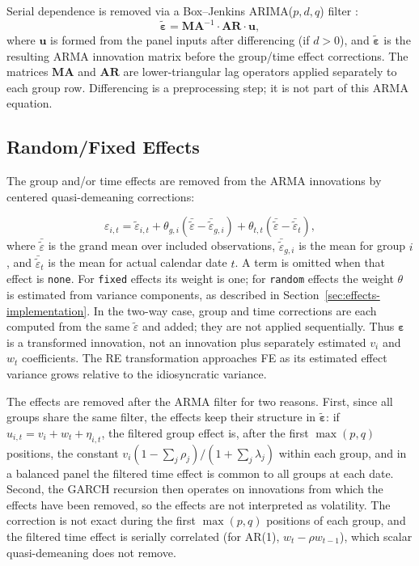 \documentclass[12pt]{article}
\begin{document}
Serial dependence is removed via a Box--Jenkins ARIMA($p,d,q$) filter \citep{box1970time}:
\begin{equation}
\tilde{\boldsymbol{\varepsilon}}
= \mathbf{MA}^{-1} \cdot \mathbf{AR} \cdot \mathbf{u},
\label{eq:arima_reduced}
\end{equation}
where $\mathbf{u}$ is formed from the panel inputs after differencing (if $d>0$), and $\tilde{\boldsymbol{\varepsilon}}$ is the resulting ARMA innovation matrix before the group/time effect corrections. The matrices $\mathbf{MA}$ and $\mathbf{AR}$ are lower-triangular lag operators applied separately to each group row. Differencing is a preprocessing step; it is not part of this ARMA equation.

\subsection{Random/Fixed Effects}

The group and/or time effects are removed from the ARMA innovations by centered quasi-demeaning corrections:

\begin{equation}
\varepsilon_{i,t}
= \tilde{\varepsilon}_{i,t}
 + \theta_{g,i}\left(\bar{\tilde{\varepsilon}}-\bar{\tilde{\varepsilon}}_{g,i}\right)
 + \theta_{t,t}\left(\bar{\tilde{\varepsilon}}-\bar{\tilde{\varepsilon}}_{t}\right),
\label{eq:rRE_def}
\end{equation}
where $\bar{\tilde{\varepsilon}}$ is the grand mean over included observations, $\bar{\tilde{\varepsilon}}_{g,i}$ is the mean for group $i$, and $\bar{\tilde{\varepsilon}}_{t}$ is the mean for actual calendar date $t$. A term is omitted when that effect is \texttt{none}. For \texttt{fixed} effects its weight is one; for \texttt{random} effects the weight $\theta$ is estimated from variance components, as described in Section~\ref{sec:effects-implementation}. In the two-way case, group and time corrections are each computed from the same $\tilde{\varepsilon}$ and added; they are not applied sequentially. Thus $\boldsymbol{\varepsilon}$ is a transformed innovation, not an innovation plus separately estimated $v_i$ and $w_t$ coefficients. The RE transformation approaches FE as its estimated effect variance grows relative to the idiosyncratic variance.

The effects are removed after the ARMA filter for two reasons. First, since all groups share the same filter, the effects keep their structure in $\tilde{\boldsymbol{\varepsilon}}$: if $u_{i,t}=v_i+w_t+\eta_{i,t}$, the filtered group effect is, after the first $\max(p,q)$ positions, the constant $v_i\left(1-\sum_j\rho_j\right)/\left(1+\sum_j\lambda_j\right)$ within each group, and in a balanced panel the filtered time effect is common to all groups at each date. Second, the GARCH recursion then operates on innovations from which the effects have been removed, so the effects are not interpreted as volatility. The correction is not exact during the first $\max(p,q)$ positions of each group, and the filtered time effect is serially correlated (for AR(1), $w_t-\rho w_{t-1}$), which scalar quasi-demeaning does not remove.
\end{document}
